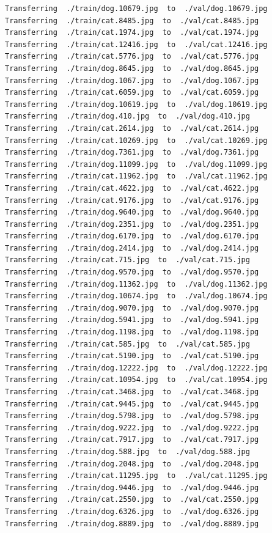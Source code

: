 \documentclass[]{book}
\theoremstyle{definition}
\theoremstyle{definition}
\theoremstyle{definition}
\theoremstyle{remark}
\begin{document}
\begin{verbatim}
Transferring  ./train/dog.10679.jpg  to  ./val/dog.10679.jpg
Transferring  ./train/cat.8485.jpg  to  ./val/cat.8485.jpg
Transferring  ./train/cat.1974.jpg  to  ./val/cat.1974.jpg
Transferring  ./train/cat.12416.jpg  to  ./val/cat.12416.jpg
Transferring  ./train/cat.5776.jpg  to  ./val/cat.5776.jpg
Transferring  ./train/dog.8645.jpg  to  ./val/dog.8645.jpg
Transferring  ./train/dog.1067.jpg  to  ./val/dog.1067.jpg
Transferring  ./train/cat.6059.jpg  to  ./val/cat.6059.jpg
Transferring  ./train/dog.10619.jpg  to  ./val/dog.10619.jpg
Transferring  ./train/dog.410.jpg  to  ./val/dog.410.jpg
Transferring  ./train/cat.2614.jpg  to  ./val/cat.2614.jpg
Transferring  ./train/cat.10269.jpg  to  ./val/cat.10269.jpg
Transferring  ./train/dog.7361.jpg  to  ./val/dog.7361.jpg
Transferring  ./train/dog.11099.jpg  to  ./val/dog.11099.jpg
Transferring  ./train/cat.11962.jpg  to  ./val/cat.11962.jpg
Transferring  ./train/cat.4622.jpg  to  ./val/cat.4622.jpg
Transferring  ./train/cat.9176.jpg  to  ./val/cat.9176.jpg
Transferring  ./train/dog.9640.jpg  to  ./val/dog.9640.jpg
Transferring  ./train/dog.2351.jpg  to  ./val/dog.2351.jpg
Transferring  ./train/dog.6170.jpg  to  ./val/dog.6170.jpg
Transferring  ./train/dog.2414.jpg  to  ./val/dog.2414.jpg
Transferring  ./train/cat.715.jpg  to  ./val/cat.715.jpg
Transferring  ./train/dog.9570.jpg  to  ./val/dog.9570.jpg
Transferring  ./train/dog.11362.jpg  to  ./val/dog.11362.jpg
Transferring  ./train/dog.10674.jpg  to  ./val/dog.10674.jpg
Transferring  ./train/dog.9070.jpg  to  ./val/dog.9070.jpg
Transferring  ./train/dog.5941.jpg  to  ./val/dog.5941.jpg
Transferring  ./train/dog.1198.jpg  to  ./val/dog.1198.jpg
Transferring  ./train/cat.585.jpg  to  ./val/cat.585.jpg
Transferring  ./train/cat.5190.jpg  to  ./val/cat.5190.jpg
Transferring  ./train/dog.12222.jpg  to  ./val/dog.12222.jpg
Transferring  ./train/cat.10954.jpg  to  ./val/cat.10954.jpg
Transferring  ./train/cat.3468.jpg  to  ./val/cat.3468.jpg
Transferring  ./train/cat.9445.jpg  to  ./val/cat.9445.jpg
Transferring  ./train/dog.5798.jpg  to  ./val/dog.5798.jpg
Transferring  ./train/dog.9222.jpg  to  ./val/dog.9222.jpg
Transferring  ./train/cat.7917.jpg  to  ./val/cat.7917.jpg
Transferring  ./train/dog.588.jpg  to  ./val/dog.588.jpg
Transferring  ./train/dog.2048.jpg  to  ./val/dog.2048.jpg
Transferring  ./train/cat.11295.jpg  to  ./val/cat.11295.jpg
Transferring  ./train/dog.9446.jpg  to  ./val/dog.9446.jpg
Transferring  ./train/cat.2550.jpg  to  ./val/cat.2550.jpg
Transferring  ./train/dog.6326.jpg  to  ./val/dog.6326.jpg
Transferring  ./train/dog.8889.jpg  to  ./val/dog.8889.jpg

\end{verbatim}
\end{document}
